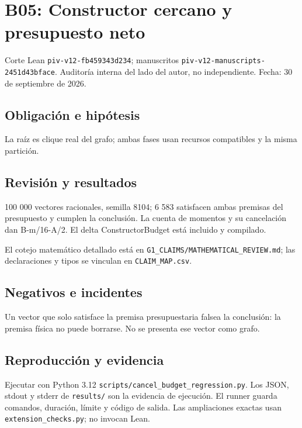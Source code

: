 \section{B05: Constructor cercano y presupuesto
neto}\label{b05-constructor-cercano-y-presupuesto-neto}

Corte Lean \texttt{piv-v12-fb459343d234}; manuscritos
\texttt{piv-v12-manuscripts-2451d43bface}. Auditoría interna del lado
del autor, no independiente. Fecha: 30 de septiembre de 2026.

\subsection{Obligación e hipótesis}\label{obligaciuxf3n-e-hipuxf3tesis}

La raíz es clique real del grafo; ambas fases usan recursos compatibles
y la misma partición.

\subsection{Revisión y resultados}\label{revisiuxf3n-y-resultados}

100 000 vectores racionales, semilla 8104; 6 583 satisfacen ambas
premisas del presupuesto y cumplen la conclusión. La cuenta de momentos
y su cancelación dan B-m/16-A/2. El delta ConstructorBudget está
incluido y compilado.

El cotejo matemático detallado está en
\texttt{G1\_CLAIMS/MATHEMATICAL\_REVIEW.md}; las declaraciones y tipos
se vinculan en \texttt{CLAIM\_MAP.csv}.

\subsection{Negativos e incidentes}\label{negativos-e-incidentes}

Un vector que solo satisface la premisa presupuestaria falsea la
conclusión: la premisa física no puede borrarse. No se presenta ese
vector como grafo.

\subsection{Reproducción y evidencia}\label{reproducciuxf3n-y-evidencia}

Ejecutar con Python 3.12 \texttt{scripts/cancel\_budget\_regression.py}.
Los JSON, stdout y stderr de \texttt{results/} son la evidencia de
ejecución. El runner guarda comandos, duración, límite y código de
salida. Las ampliaciones exactas usan \texttt{extension\_checks.py}; no
invocan Lean.

